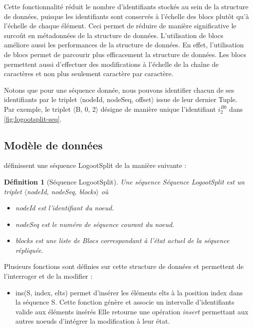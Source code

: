\documentclass[12pt]{thesul}
\newtheorem{definition}{Définition}
\newcommand{\trm}[1]{\mathit{#1}}
\newcommand{\id}[3]{$\trm{#1}^{\trm{#2}}_{\trm{#3}}$}
\begin{document}
Cette fonctionnalité réduit le nombre d'identifiants stockés au sein de la structure de données, puisque les identifiants sont conservés à l'échelle des blocs plutôt qu'à l'échelle de chaque élément.
Ceci permet de réduire de manière significative le surcoût en métadonnées de la structure de données.
L'utilisation de blocs améliore aussi les performances de la structure de données.
En effet, l'utilisation de blocs permet de parcourir plus efficacement la structure de données.
Les blocs permettent aussi d'effectuer des modifications à l'échelle de la chaîne de caractères et non plus seulement caractère par caractère.


Notons que pour une séquence donnée, nous pouvons identifier chacun de ses identifiants par le triplet $\langle$nodeId, nodeSeq, offset$\rangle$ issue de leur dernier Tuple.
Par exemple, le triplet $\langle$B, 0, 2$\rangle$ désigne de manière unique l'identifiant \id{i}{B0}{2} dans \autoref{fig:logootsplit-seq}.

\subsection{Modèle de données}

\textcite{2013-logootsplit} définissent une séquence LogootSplit de la manière suivante :

\begin{definition}[Séquence LogootSplit]
  \label{def:logootsplit}
  Une séquence \emph{Séquence LogootSplit} est un triplet $\langle$nodeId, nodeSeq, blocks$\rangle$ où
  \begin{itemize}
    \item nodeId est l'identifiant du noeud.
    \item nodeSeq est le numéro de séquence courant du noeud.
    \item blocks est une liste de Blocs correspondant à l'état actuel de la séquence répliquée.
  \end{itemize}
\end{definition}

Plusieurs fonctions sont définies sur cette structure de données et permettent de l'interroger et de la modifier :

\begin{itemize}
  \item ins(S, index, elts) permet d'insérer les éléments elts à la position index dans la séquence S.
    Cette fonction génère et associe un intervalle d'identifiants valide aux éléments insérés
    Elle retourne une opération \emph{insert} permettant aux autres noeuds d'intégrer la modification à leur état.
\end{itemize}
\end{document}
